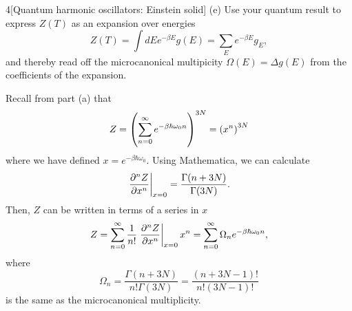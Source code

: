\documentclass[12pt]{article}
\begin{document}
\begin{problem}{4}[Quantum harmonic oscillators: Einstein solid]
(e) Use your quantum result to express $Z(T)$ as an expansion over energies
\begin{equation}
    Z(T)=\int dEe^{-\beta E}g(E)=\sum_Ee^{-\beta E}g_E, 
\end{equation}
and thereby read off the microcanonical multipicity $\Omega(E)=\Delta g(E)$ from
the coefficients of the expansion.
\begin{solution}
Recall from part (a) that
\begin{equation}
    Z=\qty(\sum_{n=0}^\infty e^{-\beta\hbar\omega_0n})^{3N}
    =\qty(x^n)^{3N}
\end{equation}
where we have defined $x=e^{-\beta\hbar\omega_0}$. Using Mathematica, we can
calculate
\begin{equation}
    \eval{\frac{\partial^nZ}{\partial x^n}}_{x=0}
    =\frac{\Gamma(n+3N)}{\Gamma(3N)}.
\end{equation}
Then, $Z$ can be written in terms of a series in $x$
\begin{equation}
    Z=\sum_{n=0}^\infty \frac1{n!}\eval{\frac{\partial^nZ}{\partial
    x^n}}_{x=0}x^n 
    =\sum_{n=0}^\infty\Omega_ne^{-\beta\hbar\omega_0n},
\end{equation}
where
\begin{equation}
    \Omega_n=\frac{\Gamma(n+3N)}{n!\Gamma(3N)} 
    =\frac{(n+3N-1)!}{n!(3N-1)!}
\end{equation}
is the same as the microcanonical multiplicity.
\end{solution}
    
\end{problem}
\newpage
\end{document}
